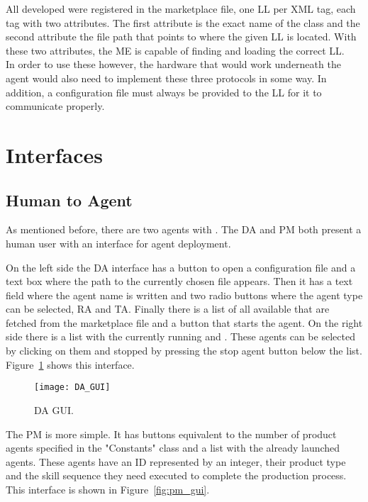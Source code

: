 All developed  were registered in the marketplace file, one \acrshort{LL} per \acrshort{XML} tag, each tag with two attributes. The first attribute is the exact name of the class and the second attribute the file path that points to where the given \acrshort{LL} is located. With these two attributes, the \acrshort{ME} is capable of finding and loading the correct \acrshort{LL}.\\

In order to use these  however, the hardware that would work underneath the agent would also need to implement these three protocols in some way. In addition, a configuration file must always be provided to the \acrshort{LL} for it to communicate properly.\\

\section{Interfaces}
\label{sec:interfaces}

\subsection{Human to Agent}
\label{subsec:human_to_agent_interface}

As mentioned before, there are two agents with . The \acrlong{DA} and \acrlong{PM} both present a human user with an interface for agent deployment.

On the left side the \acrshort{DA} interface has a button to open a configuration file and a text box where the path to the currently chosen file appears. Then it has a text field where the agent name is written and two radio buttons where the agent type can be selected, \acrlong{RA} and \acrlong{TA}. Finally there is a list of all available  that are fetched from the marketplace file and a button that starts the agent. On the right side there is a list with the currently running  and . These agents can be selected by clicking on them and stopped by pressing the stop agent button below the list. Figure~\ref{fig:da_gui} shows this interface.\\

\begin{figure}[h!]
	\centering
	\texttt{[image: DA\_GUI]}
	\caption{\acrlong{DA} \acrlong{GUI}.}
	\label{fig:da_gui}
\end{figure}

The \acrshort{PM} is more simple. It has buttons equivalent to the number of product agents specified in the "Constants" class and a list with the already launched agents. These agents have an ID represented by an integer, their product type and the skill sequence they need executed to complete the production process. This interface is shown in Figure~\ref{fig:pm_gui}.


